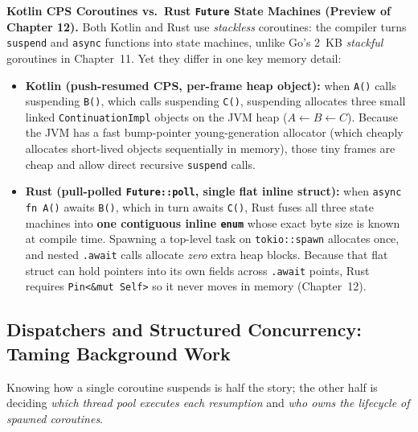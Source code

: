 \begin{connectionbox}
\textbf{Kotlin CPS Coroutines vs.\ Rust \texttt{Future} State Machines (Preview of Chapter 12).} Both Kotlin and Rust use \emph{stackless} coroutines: the compiler turns \texttt{suspend} and \texttt{async} functions into state machines, unlike Go's 2~KB \emph{stackful} goroutines in Chapter~11. Yet they differ in one key memory detail:
\begin{itemize}
  \item \textbf{Kotlin (push-resumed CPS, per-frame heap object):} when \texttt{A()} calls suspending \texttt{B()}, which calls suspending \texttt{C()}, suspending allocates three small linked \texttt{ContinuationImpl} objects on the JVM heap ($A \leftarrow B \leftarrow C$). Because the JVM has a fast bump-pointer young-generation allocator (which cheaply allocates short-lived objects sequentially in memory), those tiny frames are cheap and allow direct recursive \texttt{suspend} calls.
  \item \textbf{Rust (pull-polled \texttt{Future::poll}, single flat inline struct):} when \texttt{async fn A()} awaits \texttt{B()}, which in turn awaits \texttt{C()}, Rust fuses all three state machines into \textbf{one contiguous inline \texttt{enum}} whose exact byte size is known at compile time. Spawning a top-level task on \texttt{tokio::spawn} allocates once, and nested \texttt{.await} calls allocate \emph{zero} extra heap blocks. Because that flat struct can hold pointers into its own fields across \texttt{.await} points, Rust requires \texttt{Pin<\&mut Self>} so it never moves in memory (Chapter~12).
\end{itemize}
\end{connectionbox}

\subsection{Dispatchers and Structured Concurrency: Taming Background Work}

Knowing how a single coroutine suspends is half the story; the other half is deciding \emph{which thread pool executes each resumption} and \emph{who owns the lifecycle of spawned coroutines}.

